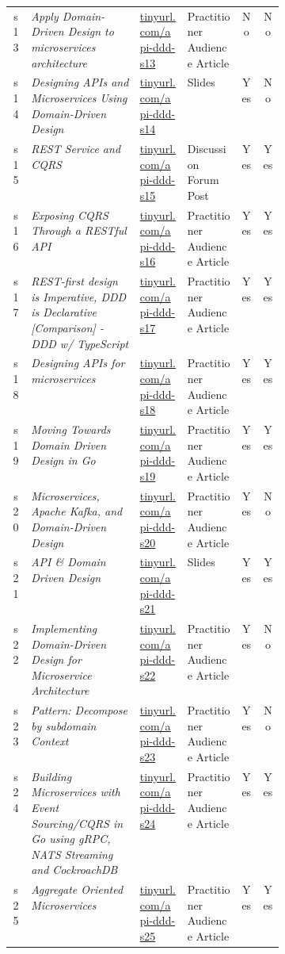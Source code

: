 \begin{tabular}{|c|p{0.4\linewidth}|l|l|c|c|}
s13 &  {\em Apply Domain-Driven Design to microservices architecture} & \href{https://tinyurl.com/api-ddd-s13}{tinyurl.com/api-ddd-s13} & Practitioner Audience Article & No & No\\
s14 &  {\em Designing APIs and Microservices Using Domain-Driven Design} & \href{https://tinyurl.com/api-ddd-s14}{tinyurl.com/api-ddd-s14} & Slides & Yes & No\\
s15 &  {\em REST Service and CQRS} & \href{https://tinyurl.com/api-ddd-s15}{tinyurl.com/api-ddd-s15} & Discussion Forum Post & Yes & Yes\\
s16 &  {\em Exposing CQRS Through a RESTful API} & \href{https://tinyurl.com/api-ddd-s16}{tinyurl.com/api-ddd-s16} & Practitioner Audience Article & Yes & Yes\\
s17 &  {\em REST-first design is Imperative, DDD is Declarative [Comparison] - DDD w/ TypeScript} & \href{https://tinyurl.com/api-ddd-s17}{tinyurl.com/api-ddd-s17} & Practitioner Audience Article & Yes & Yes\\
s18 &  {\em Designing APIs for microservices} & \href{https://docs.microsoft.com/en-us/azure/architecture/microservices/design/api-design}{tinyurl.com/api-ddd-s18} & Practitioner Audience Article & Yes & Yes\\
s19 &  {\em Moving Towards Domain Driven Design in Go} & \href{https://tinyurl.com/api-ddd-s19}{tinyurl.com/api-ddd-s19} & Practitioner Audience Article & Yes & Yes\\
s20 &  {\em Microservices, Apache Kafka, and Domain-Driven Design} & \href{https://tinyurl.com/api-ddd-s20}{tinyurl.com/api-ddd-s20} & Practitioner Audience Article & Yes & No\\
s21 &  {\em API \& Domain Driven Design} & \href{https://tinyurl.com/api-ddd-s21}{tinyurl.com/api-ddd-s21} & Slides & Yes & Yes\\
s22 &  {\em Implementing Domain-Driven Design for Microservice Architecture} & \href{https://tinyurl.com/api-ddd-s22}{tinyurl.com/api-ddd-s22} & Practitioner Audience Article & Yes & No\\
s23 &  {\em Pattern: Decompose by subdomain Context} & \href{https://tinyurl.com/api-ddd-s23}{tinyurl.com/api-ddd-s23} & Practitioner Audience Article & Yes & No\\
s24 &  {\em Building Microservices with Event Sourcing/CQRS in Go using gRPC, NATS Streaming and CockroachDB} & \href{https://tinyurl.com/api-ddd-s24}{tinyurl.com/api-ddd-s24} & Practitioner Audience Article & Yes & Yes\\
s25 &  {\em Aggregate Oriented Microservices} & \href{https://tinyurl.com/api-ddd-s25}{tinyurl.com/api-ddd-s25} & Practitioner Audience Article & Yes & Yes\\

\end{tabular}
